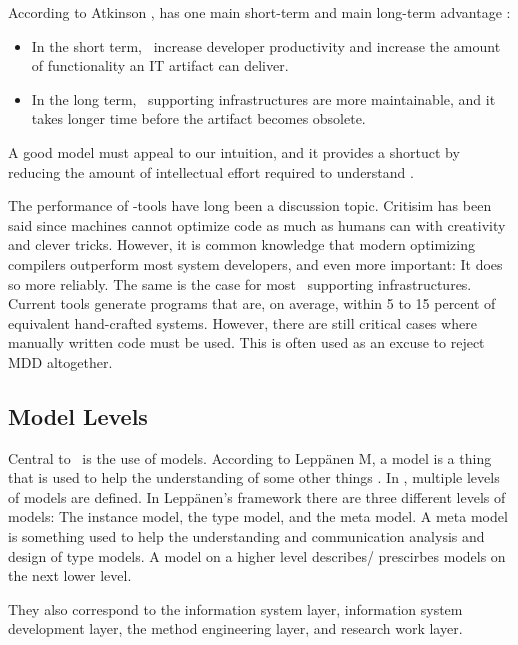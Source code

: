 According to Atkinson \ea, \mde has one main short-term and main long-term advantage \cite{Atkinson2003-wr}:
\begin{itemize}
    \item In the short term, \mde~increase developer productivity and increase the amount of functionality an IT artifact can deliver.
    \item In the long term, \mdd~supporting infrastructures are more maintainable, and it takes longer time before the artifact becomes obsolete.
\end{itemize}

A good model must appeal to our intuition, and it provides a shortuct by reducing the amount of intellectual effort required to understand \cite{Selic2013-qa}.

The performance of \mdd-tools have long been a discussion topic. Critisim has been said since machines cannot optimize code as much as humans can with creativity and clever tricks. However, it is common knowledge that modern optimizing compilers outperform most system developers, and even more important: It does so more reliably. The same is the case for most \mde~supporting infrastructures. Current tools generate programs that are, on average, within 5 to 15 percent of equivalent hand-crafted systems. However, there are still critical cases where manually written code must be used. This is often used as an excuse to reject MDD altogether.

\subsection{Model Levels}
\label{sub:Model Levels}
Central to \mde~is the use of models. According to Leppänen M, a model is a thing that is used to help the understanding of some other things \cite{Leppanen2006-ay}. In \mdd, multiple levels of models are defined. In Leppänen's framework there are three different levels of models: The instance model, the type model, and the meta model. A meta model is something used to help the understanding and communication analysis and design of type models. A model on a higher level describes/ prescirbes models on the next lower level.

They also correspond to the information system layer, information system development layer, the method engineering layer, and research work layer.

